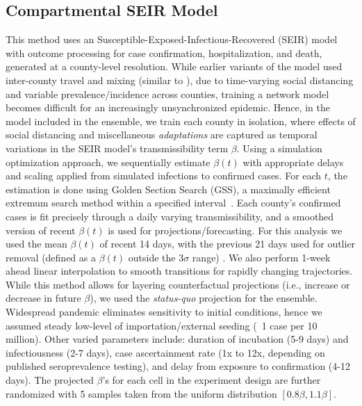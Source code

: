 \documentclass[sigconf]{acmart}
\begin{document}
\subsection{Compartmental SEIR Model}
This method uses an Susceptible-Exposed-Infectious-Recovered (SEIR) model with outcome processing for case confirmation, hospitalization, and death, generated at a county-level resolution. While earlier variants of the model used inter-county travel and mixing (similar to \cite{venkatramanan2019optimizing}), due to time-varying social distancing and variable prevalence/incidence across counties, training a network model becomes difficult for an increasingly unsynchronized epidemic. Hence, in the model included in the ensemble, we train each county in isolation, where effects of social distancing and miscellaneous \emph{adaptations} are captured as temporal variations in the SEIR model's transmissibility term $\beta$. Using a simulation optimization approach, we sequentially estimate $\beta(t)$ with appropriate delays and scaling applied from simulated infections to confirmed cases. For each $t$, the estimation is done using Golden Section Search (GSS), a maximally efficient extremum search method within a specified interval~\cite{kiefer1953sequential}. Each county's confirmed cases is fit precisely through a daily varying transmissibility, and a smoothed version of recent $\beta(t)$ is used for projections/forecasting. For this analysis we used the mean $\beta(t)$ of recent 14 days, with the previous 21 days used for outlier removal (defined as a $\beta(t)$ outside the $3\sigma$ range) . We also perform 1-week ahead linear interpolation to smooth transitions for rapidly changing trajectories. While this method allows for layering counterfactual projections (i.e., increase or decrease in future $\beta$), we used the \emph{status-quo} projection for the ensemble. Widespread pandemic eliminates sensitivity to initial conditions, hence we assumed steady low-level of importation/external seeding (~1 case per 10 million). Other varied parameters include: duration of incubation (5-9 days) and infectiousness (2-7 days), case ascertainment rate (1x to 12x, depending on published seroprevalence testing), and delay from exposure to confirmation (4-12 days). The projected $\beta$'s for each cell in the experiment design are further randomized with 5 samples taken from the uniform distribution $[0.8\beta, 1.1\beta]$. 
\end{document}
